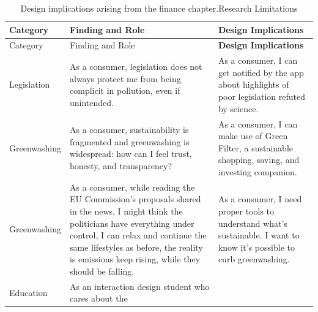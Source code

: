 \documentclass[
  12pt,
  letterpaper,
  DIV=11,
  numbers=noendperiod]{scrartcl}
\begin{document}
\begin{longtable}[]{@{}
  >{\raggedright\arraybackslash}p{}
  >{\raggedright\arraybackslash}p{}
  >{\raggedright\arraybackslash}p{}@{}}
\caption{Design implications arising from the finance chapter.Research
Limitations}\tabularnewline
\toprule\noalign{}
\begin{minipage}[b]{\linewidth}\raggedright
Category
\end{minipage} & \begin{minipage}[b]{\linewidth}\raggedright
Finding and Role
\end{minipage} & \begin{minipage}[b]{\linewidth}\raggedright
\textbf{Design Implications}
\end{minipage} \\
\midrule\noalign{}
\endfirsthead
\toprule\noalign{}
\begin{minipage}[b]{\linewidth}\raggedright
Category
\end{minipage} & \begin{minipage}[b]{\linewidth}\raggedright
Finding and Role
\end{minipage} & \begin{minipage}[b]{\linewidth}\raggedright
\textbf{Design Implications}
\end{minipage} \\
\midrule\noalign{}
\endhead
\bottomrule\noalign{}
\endlastfoot
Legislation & As a consumer, legislation does not always protect me from
being complicit in pollution, even if unintended. & As a consumer, I can
get notified by the app about highlights of poor legislation refuted by
science. \\
Greenwashing & As a consumer, sustainability is fragmented and
greenwashing is widespread: how can I feel trust, honesty, and
transparency? & As a consumer, I can make use of Green Filter, a
sustainable shopping, saving, and investing companion. \\
Greenwashing & As a consumer, while reading the EU Commission's
proposals shared in the news, I might think the politicians have
everything under control, I can relax and continue the same lifestyles
as before, the reality is emissions keep rising, while they should be
falling. & As a consumer, I need proper tools to understand what's
sustainable. I want to know it's possible to curb greenwashing. \\
Education & As an interaction design student who cares about the

\end{longtable}
\end{document}
